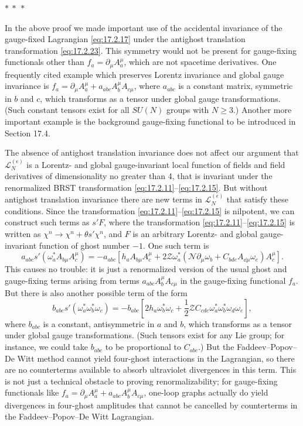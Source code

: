 \begin{center}
$*\ *\ *$
\end{center}

In the above proof we made important use of the accidental invariance of the gauge-fixed Lagrangian \eqref{eq:17.2.17} under the antighost translation transformation \eqref{eq:17.2.23}. This symmetry would not be present for gauge-fixing functionals other than $f_a=\partial_\mu A_a^\mu$, which are not spacetime derivatives. One frequently cited example which preserves Lorentz invariance and global gauge invariance is $f_a=\partial_\mu A_a^\mu+a_{abc}A_b^\mu A_{c\mu}$, where $a_{abc}$ is a constant matrix, symmetric in $b$ and $c$, which transforms as a tensor under global gauge transformations. (Such constant tensors exist for all $SU(N)$ groups with $N\geq3$.) Another more important example is the background gauge-fixing functional to be introduced in Section 17.4.

The absence of antighost translation invariance does not affect our argument that $\mathcal L_N^{(\epsilon)}$ is a Lorentz- and global gauge-invariant local function of fields and field derivatives of dimensionality no greater than 4, that is invariant under the renormalized BRST transformation \eqref{eq:17.2.11}--\eqref{eq:17.2.15}. But without antighost translation invariance there are new terms in $\mathcal L_N^{(\epsilon)}$ that satisfy these conditions. Since the transformation \eqref{eq:17.2.11}--\eqref{eq:17.2.15} is nilpotent, we can construct such terms as $s'F$, where the transformation \eqref{eq:17.2.11}--\eqref{eq:17.2.15} is written as $\chi^n\to\chi^n+\theta s'\chi^n$, and $F$ is an arbitrary Lorentz- and global gauge-invariant function of ghost number $-1$. One such term is
\[
a_{abc}s'(\omega_a^*A_{b\mu}A_c^\mu)
=-a_{abc}\left[
h_a A_{b\mu}A_c^\mu
+2\mathcal Z\omega_a^*(\mathcal N\partial_\mu\omega_b
+C_{bde}A_{\dd\mu}\omega_e)A_c^\mu
\right].
\]
This causes no trouble: it is just a renormalized version of the usual ghost and gauge-fixing terms arising from terms $a_{abc}A_b^\mu A_{c\mu}$ in the gauge-fixing functional $f_a$. But there is also another possible term of the form
\[
b_{abc}s'(\omega_a^*\omega_b^*\omega_c)
=-b_{abc}\left[
2h_a\omega_b^*\omega_c
+\frac12\mathcal Z C_{cde}
\omega_a^*\omega_b^*\omega_d\omega_e
\right],
\]
where $b_{abc}$ is a constant, antisymmetric in $a$ and $b$, which transforms as a tensor under global gauge transformations. (Such tensors exist for any Lie group; for instance, we could take $b_{abc}$ to be proportional to $C_{abc}$.) But the Faddeev--Popov--De Witt method cannot yield four-ghost interactions in the Lagrangian, so there are no counterterms available to absorb ultraviolet divergences in this term. This is not just a technical obstacle to proving renormalizability; for gauge-fixing functionals like $f_a=\partial_\mu A_a^\mu+a_{abc}A_b^\mu A_{c\mu}$, one-loop graphs actually do yield divergences in four-ghost amplitudes that cannot be cancelled by counterterms in the Faddeev--Popov--De Witt Lagrangian.

